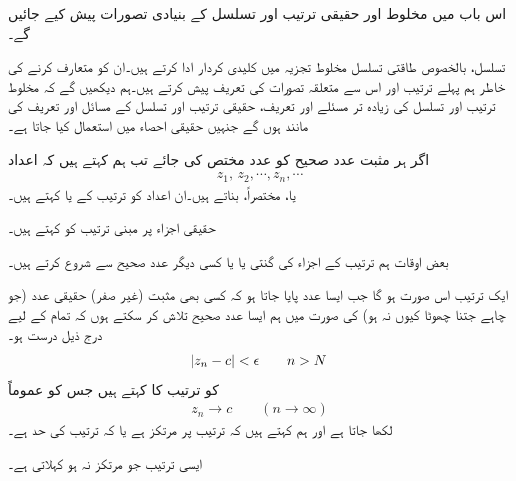 اس باب میں مخلوط اور حقیقی ترتیب اور تسلسل کے بنیادی تصورات پیش کیے جائیں گے۔

تسلسل، بالخصوص طاقتی تسلسل مخلوط تجزیہ میں کلیدی کردار ادا کرتے ہیں۔ان کو متعارف کرنے کی خاطر ہم پہلے ترتیب اور اس سے متعلقہ تصورات کی تعریف پیش کرتے ہیں۔ہم دیکھیں گے کہ مخلوط  ترتیب اور تسلسل کی زیادہ تر مسئلے اور تعریف، حقیقی ترتیب اور تسلسل کے مسائل اور تعریف کی مانند ہوں گے جنہیں حقیقی احصاء میں استعمال کیا جاتا ہے۔

اگر ہر مثبت عدد صحیح  کو عدد  مختص کی جائے تب  ہم کہتے ہیں کہ اعداد
\begin{align*}
z_1,\,z_2,\cdots,z_n,\cdots
\end{align*} 
 یا،  مختصراً،  بناتے ہیں۔ان  اعداد  کو ترتیب کے  یا   کہتے ہیں۔

حقیقی اجزاء پر مبنی ترتیب کو  کہتے ہیں۔

بعض اوقات ہم ترتیب کے اجزاء کی گنتی  یا  یا کسی دیگر عدد صحیح سے شروع کرتے ہیں۔

ایک ترتیب  اس صورت     ہو گا جب ایسا عدد  پایا جاتا ہو کہ کسی بھی مثبت  (غیر صفر) حقیقی عدد  (جو چاہے جتنا چھوٹا کیوں نہ ہو) کی صورت میں ہم ایسا عدد صحیح  تلاش کر سکتے ہوں کہ  تمام  کے لیے درج ذیل درست ہو۔
\begin{align}\label{مساوات_ترتیب_حد_الف}
\abs{z_n-c}<\epsilon \quad \quad  n>N
\end{align}
 کو ترتیب کا  کہتے ہیں جس کو عموماً
\begin{align*}
z_n\to c\quad\quad (n\to \infty)
\end{align*}
لکھا جاتا ہے اور ہم کہتے ہیں کہ ترتیب  پر مرتکز ہے یا کہ ترتیب کی حد  ہے۔

ایسی ترتیب جو مرتکز نہ ہو  کہلاتی ہے۔

